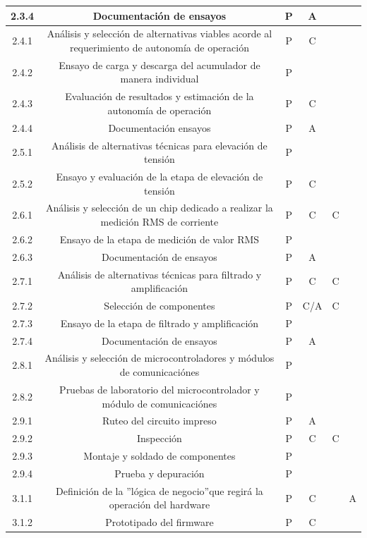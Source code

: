 \documentclass[11pt]{charter}
\begin{document}
\begin{table}[H]
{\begin{tabular}{|c|c|c|c|c|c|}
 2.3.4& Documentación de ensayos & P & A &  &  \\ \hline
 2.4.1& Análisis y selección de alternativas viables acorde al requerimiento de autonomía de operación & P & C &  &  \\ \hline
 2.4.2& Ensayo de carga y descarga del acumulador de manera individual & P &  &  &  \\ \hline
 2.4.3& Evaluación de resultados y estimación de la autonomía de operación & P & C &  &  \\ \hline
 2.4.4& Documentación ensayos & P & A &  &  \\ \hline
 2.5.1& Análisis de alternativas técnicas para elevación de tensión & P &  &  &  \\ \hline
 2.5.2& Ensayo y evaluación de la etapa de elevación de tensión & P & C &  &  \\ \hline
 2.6.1& Análisis y selección de un chip dedicado a realizar la medición RMS de corriente & P & C & C &  \\ \hline
 2.6.2& Ensayo de la etapa de medición de valor RMS & P &  &  &  \\ \hline
 2.6.3& Documentación de ensayos & P & A &  &  \\ \hline
 2.7.1& Análisis de alternativas técnicas para filtrado y amplificación & P & C & C &  \\ \hline
 2.7.2& Selección de componentes & P & C/A & C &  \\ \hline
 2.7.3& Ensayo de la etapa de filtrado y amplificación & P &  &  &  \\ \hline
 2.7.4& Documentación de ensayos & P & A &  &  \\ \hline
 2.8.1& Análisis y selección de microcontroladores y módulos de comunicaciónes & P &  &  &  \\ \hline
 2.8.2& Pruebas de laboratorio del microcontrolador y módulo de comunicaciónes & P &  &  &  \\ \hline
 2.9.1& Ruteo del circuito impreso & P & A &  &  \\ \hline
 2.9.2& Inspección & P & C & C &  \\ \hline
 2.9.3& Montaje y soldado de componentes & P &  &  &  \\ \hline
 2.9.4& Prueba y depuración & P &  &  &  \\ \hline
 3.1.1& Definición de la ”lógica de negocio”que regirá la operación del hardware & P & C &  & A \\ \hline
 3.1.2& Prototipado del firmware & P & C &  &  \\ \hline

\end{tabular}}
\end{table}
\end{document}

